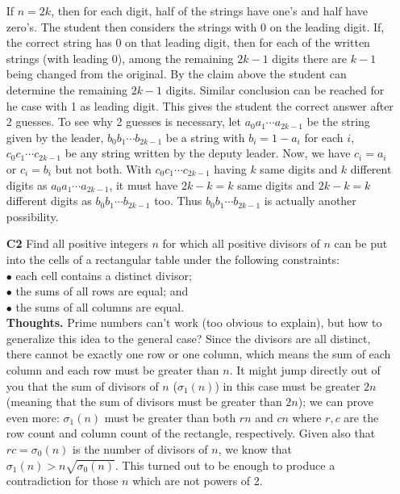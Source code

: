 \documentclass[11pt,a4paper]{article}
\begin{document}
\begin{itemize}
If $n=2k$, then for each digit, half of the strings have one's and half have zero's. 
The student then considers the strings with 0 on the leading digit. 
If, the correct string has 0 on that leading digit, then for each of the written strings (with leading 0), among the remaining $2k-1$ digits there are $k-1$ being changed from the original. By the claim above the student can determine the remaining $2k-1$ digits. 
Similar conclusion can be reached for he case with 1 as leading digit. 
This gives the student the correct answer after 2 guesses. 
To see why 2 guesses is necessary, let $a_0a_1\cdots a_{2k-1}$ be the string given by the leader, $b_0b_1\cdots b_{2k-1}$ be a string with $b_i=1-a_i$ for each $i$, $c_0c_1\cdots c_{2k-1}$ be any string written by the deputy leader. 
Now, we have $c_i=a_i$ or $c_i=b_i$ but not both. 
With $c_0c_1\cdots c_{2k-1}$ having $k$ same digits and $k$ different digits as $a_0a_1\cdots a_{2k-1}$, 
it must have $2k-k=k$ same digits and $2k-k=k$ different digits as $b_0b_1\cdots b_{2k-1}$ too. 
Thus $b_0b_1\cdots b_{2k-1}$ is actually another possibility. 

\item[\textbf{C2}]
Find all positive integers $n$ for which all positive divisors of $n$ can be put into the cells of a rectangular table under the following constraints:\\
$\bullet$ each cell contains a distinct divisor;\\
$\bullet$ the sums of all rows are equal; and\\
$\bullet$ the sums of all columns are equal.\\

\textbf{Thoughts.} 
Prime numbers can't work (too obvious to explain), but how to generalize this idea to the general case? 
Since the divisors are all distinct, there cannot be exactly one row or one column, which means the sum of each column and each row must be greater than $n$. 
It might jump directly out of you that the sum of divisors of $n$ ($\sigma_1(n)$) in this case must be greater $2n$ (meaning that the sum of divisors must be greater than $2n$); we can prove even more: $\sigma_1(n)$ must be greater than both $rn$ and $cn$ where $r, c$ are the row count and column count of the rectangle, respectively. 
Given also that $rc=\sigma_0(n)$ is the number of divisors of $n$, we know that $\sigma_1(n)>n\sqrt{\sigma_0(n)}$. 
This turned out to be enough to produce a contradiction for those $n$ which are not powers of 2. 


\end{itemize}
\end{document}

